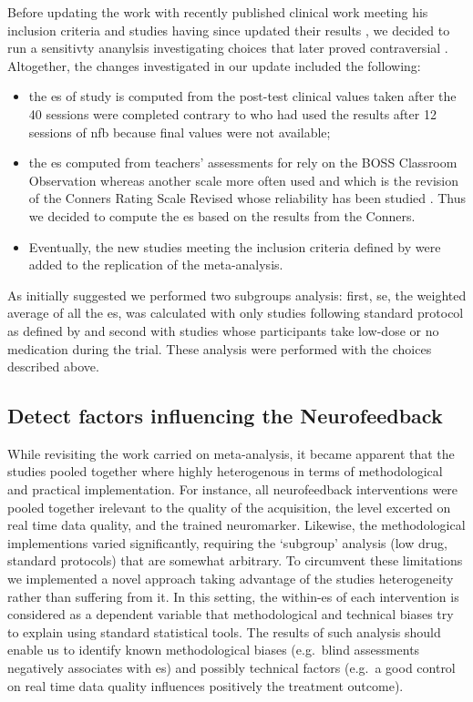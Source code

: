 Before updating the \citet{Cortese2016} work with recently published clinical work meeting his inclusion criteria \cite{} and studies having since updated their results \citeauthor{Arnold2014}, we decided to run a sensitivty ananylsis investigating choices that later proved contraversial \cite{}. Altogether, the changes investigated in our update included the following:
\begin{itemize}
\item the \gls{es} of \citeauthor{Arnold2014} study is computed from the post-test clinical values taken after the 40 sessions were completed 
contrary to \citet{Cortese2016} who had used the results after 12 sessions of \gls{nfb} because final values were not available;
\item the \gls{es} computed from teachers' assessments for \citet{Steiner2014} rely on the BOSS Classroom Observation \citep{Shapiro2010} whereas 
another scale more often used \citep{Christiansen2014, Bluschke2016} and which is the revision of the Conners Rating Scale Revised \citep{Conners1998} 
whose reliability has been studied \citep{Collett2003}. Thus we decided to compute the \gls{es} based on the results from the Conners.  
\item Eventually, the new studies meeting the inclusion criteria defined by \citeauthor{Cortese2016} were added to the replication of the meta-analysis. 
\end{itemize} 

As initially suggested we performed two subgroups analysis: first, \gls{se}, the weighted average of all the \gls{es}, was calculated with only studies following 
standard protocol as defined by \citet{Arns2014} and second with studies whose participants take low-dose or no medication during the trial. 
These analysis were performed with the choices described above. 


\subsection{Detect factors influencing the Neurofeedback}

While revisiting the work carried on meta-analysis, it became apparent that the studies pooled together where highly heterogenous in terms of methodological and practical implementation. For instance, all neurofeedback interventions were pooled together irelevant to the quality of the acquisition, the level excerted on real time data quality, and the trained neuromarker. Likewise, the methodological implementions varied significantly, requiring the `subgroup' analysis (low drug, standard protocols) that are somewhat arbitrary. To circumvent these limitations we implemented a novel approach taking advantage of the studies heterogeneity rather than suffering from it. In this setting, the within-\gls{es} of each intervention is considered as a dependent variable that methodological and technical biases try to explain using standard statistical tools. The results of such analysis should enable us to identify known methodological biases (e.g.\ blind assessments negatively associates with \gls{es}) and possibly technical factors (e.g.\ a good control on real time data quality influences positively the treatment outcome). 


